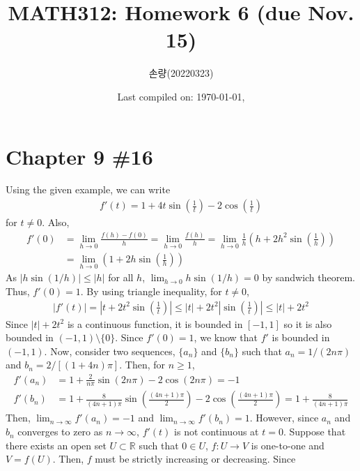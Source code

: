 \documentclass{scrartcl}
\title{MATH312: Homework 6 (due Nov. 15)}
\author{손량(20220323)}
\date{Last compiled on: \today, \currenttime}
\begin{document}
\maketitle

\section{Chapter 9 \#16}
Using the given example, we can write
\begin{align*}
  f'(t)
  = 1 + 4t \sin \left( \frac{1}{t} \right) - 2 \cos \left( \frac{1}{t} \right)
\end{align*}
for \(t \not = 0\). Also,
\begin{align*}
  f'(0)
  &= \lim_{h \to 0} \frac{f(h) - f(0)}{h}
  = \lim_{h \to 0} \frac{f(h)}{h}
  = \lim_{h \to 0}
    \frac{1}{h} \left( h + 2h^2 \sin \left( \frac{1}{h} \right) \right) \\
  &= \lim_{h \to 0} \left( 1 + 2h \sin \left( \frac{1}{h} \right) \right)
\end{align*}
As \(|h\sin (1 / h)| \le |h|\) for all \(h\), \(\lim_{h \to 0} h \sin (1 / h) =
0\) by sandwich theorem. Thus, \(f'(0) = 1\). By using triangle inequality, for
\(t \not = 0\),
\begin{align*}
  |f'(t)|
  = \left| t + 2t^2 \sin \left( \frac{1}{t} \right) \right|
  \le |t| + 2t^2 \left| \sin \left( \frac{1}{t} \right) \right|
  \le |t| + 2t^2
\end{align*}
Since \(|t| + 2t^2\) is a continuous function, it is bounded in \([-1, 1]\) so
it is also bounded in \((-1, 1) \setminus \{0\}\). Since \(f'(0) = 1\), we know
that \(f'\) is bounded in \((-1, 1)\). Now, consider two sequences, \(\{a_n\}\)
and \(\{b_n\}\) such that \(a_n = 1 / (2n\pi)\) and \(b_n = 2 / [(1 + 4n)
\pi]\). Then, for \(n \ge 1\),
\begin{align*}
  f'(a_n)
  &= 1 + \frac{2}{n\pi} \sin (2n\pi) - 2 \cos (2n\pi)
  = -1 \\
  f'(b_n)
  &= 1 + \frac{8}{(4n + 1)\pi} \sin \left( \frac{(4n + 1)\pi}{2} \right)
    - 2 \cos \left( \frac{(4n + 1)\pi}{2} \right)
  = 1 + \frac{8}{(4n + 1)\pi}
\end{align*}
Then, \(\lim_{n \to \infty} f'(a_n) = -1\) and \(\lim_{n \to \infty} f'(b_n) =
1\). However, since \(a_n\) and \(b_n\) converges to zero as \(n \to \infty\),
\(f'(t)\) is not continuous at \(t = 0\). Suppose that there exists an open set
\(U \subset \mathbb{R}\) such that \(0 \in U\), \(f: U \to V\) is one-to-one
and \(V = f(U)\). Then, \(f\) must be strictly increasing or decreasing. Since
\end{document}
